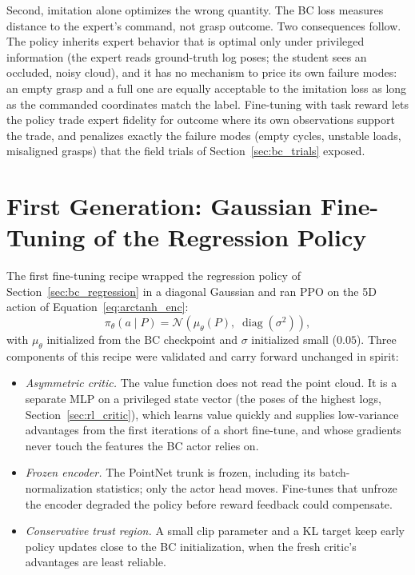 Second, imitation alone optimizes the wrong quantity. The BC loss measures
distance to the expert's command, not grasp outcome. Two consequences follow.
The policy inherits expert behavior that is optimal only under privileged
information (the expert reads ground-truth log poses; the student sees an
occluded, noisy cloud), and it has no mechanism to price its own failure
modes: an empty grasp and a full one are equally acceptable to the imitation
loss as long as the commanded coordinates match the label. Fine-tuning with
task reward lets the policy trade expert fidelity for outcome where its own
observations support the trade, and penalizes exactly the failure modes
(empty cycles, unstable loads, misaligned grasps) that the field trials of
Section~\ref{sec:bc_trials} exposed.

\section{First Generation: Gaussian Fine-Tuning of the Regression Policy}
\label{sec:rl_gen1}

The first fine-tuning recipe wrapped the regression policy of
Section~\ref{sec:bc_regression} in a diagonal Gaussian and ran PPO on the
5D action of Equation~\eqref{eq:arctanh_enc}:
\begin{equation}
  \pi_\theta(a \mid P) = \mathcal{N}\!\left( \mu_\theta(P),\;
  \operatorname{diag}(\sigma^2) \right),
\end{equation}
with $\mu_\theta$ initialized from the BC checkpoint and $\sigma$ initialized
small ($0.05$). Three components of this recipe were validated and carry
forward unchanged in spirit:

\begin{itemize}
\item \emph{Asymmetric critic.} The value function does not read the point
cloud. It is a separate MLP on a privileged state vector (the poses of the
highest logs, Section~\ref{sec:rl_critic}), which learns value quickly and
supplies low-variance advantages from the first iterations of a short
fine-tune, and whose gradients never touch the features the BC actor relies
on.
\item \emph{Frozen encoder.} The PointNet trunk is frozen, including its
batch-normalization statistics; only the actor head moves. Fine-tunes that
unfroze the encoder degraded the policy before reward feedback could
compensate.
\item \emph{Conservative trust region.} A small clip parameter and a KL
target keep early policy updates close to the BC initialization, when the
fresh critic's advantages are least reliable.
\end{itemize}

